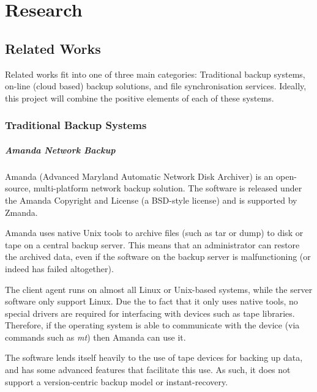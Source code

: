 \chapter{Research}

\begin{bibunit}[plain]

\section{Related Works}

Related works fit into one of three main categories: Traditional backup
systems, on-line (cloud based) backup solutions, and file synchronisation
services. Ideally, this project will combine the positive elements of each of
these systems.

\subsection{Traditional Backup Systems}

\paragraph{Amanda Network Backup}

Amanda (Advanced Maryland Automatic Network Disk Archiver) is an open-source,
multi-platform network backup solution\cite{AMANDA-about}. The software is
released under the Amanda Copyright and License (a BSD-style license) and is
supported by Zmanda\cite{AMANDA-license}.

Amanda uses native Unix tools to archive files (such as tar or dump) to disk or
tape on a central backup server. This means that an administrator can restore
the archived data, even if the software on the backup server is malfunctioning
(or indeed has failed altogether).

The client agent runs on almost all Linux or Unix-based systems, while the
server software only support Linux. Due the to fact that it only uses native
tools, no special drivers are required for interfacing with devices such as
tape libraries. Therefore, if the operating system is able to communicate with
the device (via commands such as \emph{mt}) then Amanda can use
it\cite{AMANDA-about}.

The software lends itself heavily to the use of tape devices for backing up
data, and has some advanced features that facilitate this use. As such, it does
not support a version-centric backup model or
instant-recovery\cite{AMANDA-about}.


\end{bibunit}
